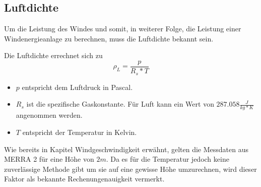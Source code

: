 \documentclass[a4paper,12pt]{article}
\begin{document}
	\subsection{Luftdichte}
	Um die Leistung des Windes und somit, in weiterer Folge, die Leistung einer Windenergieanlage zu berechnen, muss die Luftdichte bekannt sein.\\ \par
	\noindent Die Luftdichte errechnet sich zu
	\begin{equation}
	\rho_L = \frac{p}{R_s * T}
	\end{equation}
	\begin{itemize}
		\item $p$ entspricht dem Luftdruck in Pascal.
		\item $R_s$ ist die spezifische Gaskonstante. Für Luft kann ein Wert von $287.058\frac{J}{kg * K}$ angenommen werden.
		\item $T$ entspricht der Temperatur in Kelvin.	
	\end{itemize}
	Wie bereits in Kapitel Windgeschwindigkeit erwähnt, gelten die Messdaten aus MERRA 2 für eine Höhe von $2m$. Da es für die Temperatur jedoch keine zuverlässige Methode gibt um sie auf eine gewisse Höhe umzurechnen, wird dieser Faktor als bekannte Rechenungenauigkeit vermerkt.
\end{document}
